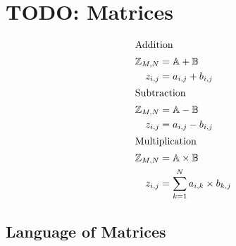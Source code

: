 \section{TODO: Matrices}
\label{sec:Matrices}

\begin{align}
  \intertext{Addition}
  \mathbb{Z}_{M,N} & = \mathbb{A} + \mathbb{B} \nonumber \\
         {z}_{i,j} & = {a}_{i,j} + {b}_{i,j} \\
  \intertext{Subtraction}
  \mathbb{Z}_{M,N} & = \mathbb{A} - \mathbb{B} \nonumber \\
         {z}_{i,j} & = {a}_{i,j} - {b}_{i,j} \\
  \intertext{Multiplication}
  \mathbb{Z}_{M,N} & = \mathbb{A} \times \mathbb{B} \nonumber \\
         {z}_{i,j} & = \sum_{k=1}^{N} {a}_{i,k} \times {b}_{k,j}
\end{align}

\subsection{Language of Matrices}
\label{sec:LanguageOfMatrices}

